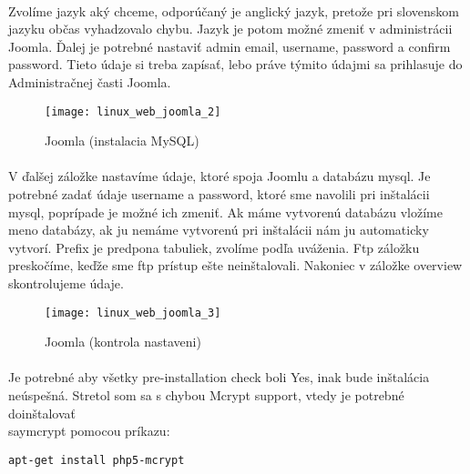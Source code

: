 \paragraph{}
Zvolíme jazyk aký chceme, odporúčaný je anglický jazyk, pretože pri slovenskom jazyku občas vyhadzovalo chybu. Jazyk je potom možné zmeniť v administrácii Joomla. Ďalej je potrebné nastaviť admin email, username, password a confirm password. Tieto údaje si treba zapísať, lebo práve týmito údajmi sa prihlasuje do Administračnej časti Joomla.

\begin{figure}[!htb]
\centering
\texttt{[image: linux\_web\_joomla\_2]}
\caption{Joomla (instalacia MySQL)}
\label{fig:web_joomla_mysql}
\end{figure}

\paragraph{}
V ďalšej záložke  nastavíme údaje, ktoré spoja Joomlu a databázu mysql. Je potrebné zadať údaje username a password, ktoré sme navolili pri inštalácii mysql, poprípade je možné ich zmeniť. Ak máme vytvorenú databázu vložíme meno databázy, ak ju nemáme vytvorenú pri inštalácii nám ju automaticky vytvorí. Prefix je predpona tabuliek, zvolíme podľa uváženia. Ftp záložku preskočíme, keďže sme ftp prístup ešte neinštalovali. Nakoniec v záložke overview skontrolujeme údaje. 

\newpage

\begin{figure}[!htb]
\centering
\texttt{[image: linux\_web\_joomla\_3]}
\caption{Joomla (kontrola nastaveni)}
\label{fig:web_joomla_check}
\end{figure}

\paragraph{}
Je potrebné aby všetky pre-installation check boli Yes, inak bude inštalácia neúspešná. Stretol som sa s chybou Mcrypt support, vtedy je potrebné doinštalovať \\say{mcrypt} pomocou príkazu:

\noindent
{\selectfont
\begin{small}
\begin{verbatim}
apt-get install php5-mcrypt
\end{verbatim}
\end{small}
}

